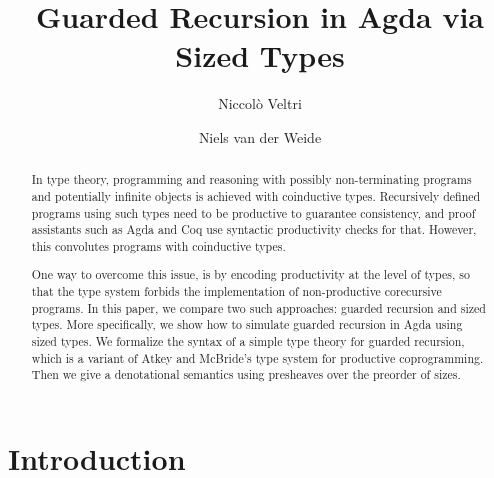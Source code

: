 \documentclass[a4paper,UKenglish,cleveref, autoref,numberwithinsect]{lipics-v2019}
\title{Guarded Recursion in Agda via Sized Types}
\author{Niccol\`o Veltri}{Department of Computer Science, IT
  University of Copenhagen, Denmark}{nive@itu.dk}{https://orcid.org/0000-0002-7230-3436}{This work was supported by a research grant (13156) from VILLUM FONDEN,
  and by DFF-Research Project 1 Grant no. 4002-00442, from The Danish Council 
  for Independent Research for the Natural Sciences (FNU).}
\author{Niels van der Weide}{Institute for Computation and Information Sciences, Radboud University, Nijmegen, The Netherlands}{nweide@cs.ru.nl}{https://orcid.org/0000-0003-1146-4161}{}
\begin{document}
\maketitle

\begin{abstract}
  In type theory, programming and reasoning with possibly
  non-terminating programs and potentially infinite objects is
  achieved with coinductive types. Recursively defined
  programs using such types need to be productive to guarantee consistency, and proof
  assistants such as Agda and Coq use syntactic
  productivity checks for that.
  However, this convolutes programs with coinductive types.
  
  One way to overcome this issue, is by encoding productivity at
  the level of types, so that the type system forbids the
  implementation of non-productive corecursive programs.
  In this paper, we compare two such approaches: guarded recursion and sized types. More specifically,
  we show how to simulate guarded recursion in Agda using sized
  types. We formalize the syntax of a simple type theory for
  guarded recursion, which is a variant of Atkey and McBride's
  type system for productive coprogramming. Then we give a denotational semantics
  using presheaves over the preorder of sizes. 
\end{abstract}

\section{Introduction}
\label{sec:intro}

\end{document}
